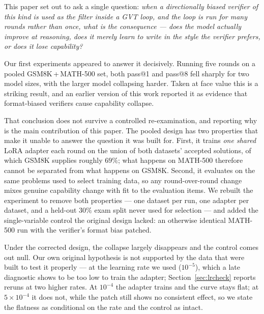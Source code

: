 \documentclass[runningheads]{llncs}
\begin{document}
This paper set out to ask a single question: \emph{when a directionally
biased verifier of this kind is used as the filter inside a GVT loop, and
the loop is run for many rounds rather than once, what is the consequence
--- does the model actually improve at reasoning, does it merely learn to
write in the style the verifier prefers, or does it lose capability?}

Our first experiments appeared to answer it decisively. Running five rounds
on a pooled GSM8K\,+\,MATH-500 set, both pass@1 and pass@8 fell sharply for
two model sizes, with the larger model collapsing harder. Taken at face
value this is a striking result, and an earlier version of this work
reported it as evidence that format-biased verifiers cause capability
collapse.

That conclusion does not survive a controlled re-examination, and reporting
why is the main contribution of this paper. The pooled design has two
properties that make it unable to answer the question it was built for.
First, it trains \emph{one shared} LoRA adapter each round on the union of
both datasets' accepted solutions, of which GSM8K supplies roughly $69\%$;
what happens on MATH-500 therefore cannot be separated from what happens on
GSM8K. Second, it evaluates on the same problems used to select training
data, so any round-over-round change mixes genuine capability change with
fit to the evaluation items. We rebuilt the experiment to remove both
properties --- one dataset per run, one adapter per dataset, and a held-out
$30\%$ exam split never used for selection --- and added the
single-variable control the original design lacked: an otherwise identical
MATH-500 run with the verifier's format bias patched.

Under the corrected design, the collapse largely disappears and the control
comes out null. Our own original hypothesis is not supported by the data
that were built to test it properly --- at the learning rate we used
($10^{-5}$), which a late diagnostic shows to be too low to train the
adapter; Section~\ref{sec:lrcheck} reports reruns at two higher rates. At
$10^{-4}$ the adapter trains and the curve stays flat; at $5\times10^{-4}$ it
does not, while the patch still shows no consistent effect, so we state the
flatness as conditional on the rate and the control as intact.
\end{document}

